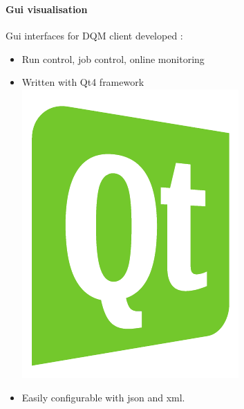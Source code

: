 \documentclass[8pt]{beamer}
\begin{document}
  \begin{frame}
    \frametitle{\secname}
    \framesubtitle{Gui visualisation}

	  Gui interfaces for DQM client developed :

      \begin{itemize}
        \item Run control, job control, online monitoring
        \item Written with Qt4 framework     \includegraphics[width=.03\textwidth]{logo/Qt_CMYK_color}
        \item Easily configurable with json and xml.
      \end{itemize}

      \end{frame}
\end{document}
